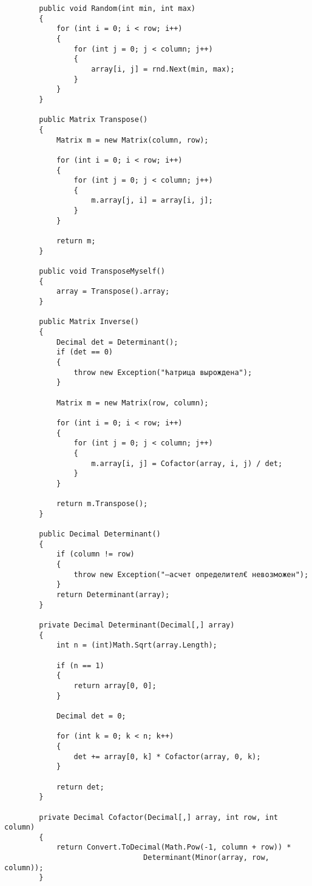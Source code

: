 \documentclass[12pt]{article} %
\begin{document}
\begin{verbatim}
        public void Random(int min, int max)
        {
            for (int i = 0; i < row; i++)
            {
                for (int j = 0; j < column; j++)
                {
                    array[i, j] = rnd.Next(min, max);
                }
            }
        }

        public Matrix Transpose()
        {
            Matrix m = new Matrix(column, row);

            for (int i = 0; i < row; i++)
            {
                for (int j = 0; j < column; j++)
                {
                    m.array[j, i] = array[i, j];
                }
            }

            return m;
        }

        public void TransposeMyself()
        {
            array = Transpose().array;
        }

        public Matrix Inverse()
        {
            Decimal det = Determinant();
            if (det == 0)
            {
                throw new Exception("ћатрица вырождена");
            }

            Matrix m = new Matrix(row, column);

            for (int i = 0; i < row; i++)
            {
                for (int j = 0; j < column; j++)
                {
                    m.array[i, j] = Cofactor(array, i, j) / det;
                }
            }

            return m.Transpose();
        }

        public Decimal Determinant()
        {
            if (column != row)
            {
                throw new Exception("–асчет определител€ невозможен");
            }
            return Determinant(array);
        }

        private Decimal Determinant(Decimal[,] array)
        {
            int n = (int)Math.Sqrt(array.Length);

            if (n == 1)
            {
                return array[0, 0];
            }

            Decimal det = 0;

            for (int k = 0; k < n; k++)
            {
                det += array[0, k] * Cofactor(array, 0, k);
            }

            return det;
        }

        private Decimal Cofactor(Decimal[,] array, int row, int column)
        {
            return Convert.ToDecimal(Math.Pow(-1, column + row)) * 
                                Determinant(Minor(array, row, column));
        }


\end{verbatim}
\end{document}
